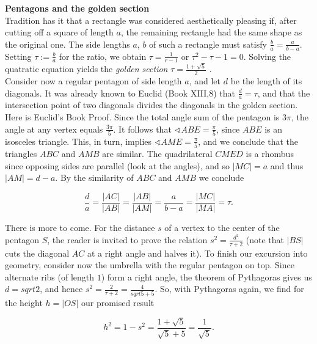 \documentclass[12pt]{memoir}
\begin{document}
\begin{mdframed}[nobreak=true]
\vspace{8pt}
{\Large\textbf{Pentagons and the golden section}}\\
[5pt]
Tradition has it that a rectangle was considered aesthetically pleasing 
if, after cutting off a square of length $a$, the remaining rectangle had 
the same shape as the original one. The side lengths $a$, $b$  of such a
rectangle must satisfy $\frac{b}{a}= \frac{a}{b-a}$. Setting $\tau := \frac{b}{a}$
for the ratio, we obtain $\tau = \frac{1}{r-1}$ or $\tau^2 - \tau - 1 = 0$. Solving
the quatratic equation yields the \textit{golden section} $\tau = \frac{1 + \sqrt{5}}{2}$ .\\

Consider now a regular pentagon of side length $a$, and let $d$ be the 
length of its diagonals. It was already known to Euclid (Book XIII,8) 
that $\frac{d}{a} = \tau$, and that the intersection point of two diagonals divides 
the diagonals in the golden section.\\

Here is Euclid's Book Proof. Since the total angle sum of the pentagon 
is $3\pi$, the angle at any vertex equals $\frac{3\pi}{5}$. It follows that 
$\sphericalangle ABE = \frac{\pi}{5}$, since $ABE$ is an isosceles triangle. This, in turn, 
implies $\sphericalangle AME = \frac{\pi}{5}$, and we conclude that the triangles $ABC$ and 
$AMB$ are similar. The quadrilateral $CMED$  is a rhombus since opposing sides are
parallel (look at the angles), and so $|MC| = a$ and thus $|AM| = d - a$. By the similarity of 
$ABC$ and $AMB$ we conclude

\begin{equation*}
  \frac{d}{a} = \frac{|AC|}{|AB|} = \frac{|AB|}{|AM|} = \frac{a}{b-a} = \frac{|MC|}{|MA|} = \tau.
\end{equation*}

There is more to come. For the distance $s$ of a vertex to the center of 
the pentagon $S$,  the reader is invited to prove the relation $s^2 = \frac{d^2}{\tau + 2}$ 
(note that $|BS|$ cuts the diagonal $AC$ at a right angle and halves it). 
To finish our excursion into geometry, consider now the umbrella 
with the regular pentagon on top. Since alternate ribs (of length $1$) 
form a right angle, the theorem of Pythagoras gives us $d = sqrt{2}$, and 
hence $s^2 = \frac{2}{\tau + 2} = \frac{4}{sqrt{5} + 5}$. So, with Pythagoras again, 
we find for the height $h = |OS|$ our promised result

\begin{equation*}
  h^2 = 1 - s^2 = \frac{1+\sqrt{5}}{\sqrt{5}+5} = \frac{1}{\sqrt{5}}.
\end{equation*}

\end{mdframed}
\end{document}
